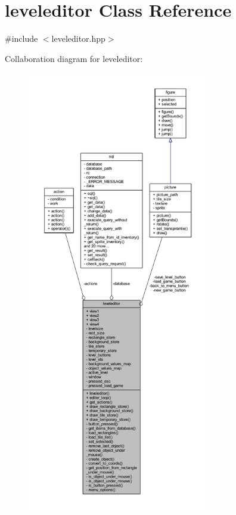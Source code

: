 \hypertarget{classleveleditor}{}\section{leveleditor Class Reference}
\label{classleveleditor}


{\ttfamily \#include $<$leveleditor.\+hpp$>$}



Collaboration diagram for leveleditor\+:
\nopagebreak
\begin{figure}[H]
\begin{center}
\leavevmode
\includegraphics[height=550pt]{classleveleditor__coll__graph}
\end{center}
\end{figure}
